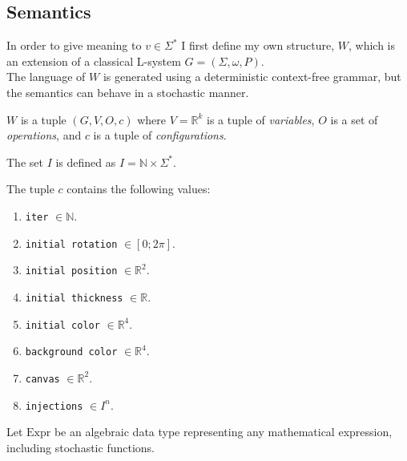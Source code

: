 \documentclass[a4paper]{article}
\begin{document}
\subsection{Semantics}

In order to give meaning to \(v \in \Sigma^*\)
I first define my own structure, \(W\), which is an extension of a classical
L-system \(G=(\Sigma, \omega, P)\). \\
The language of \(W\) is generated using a deterministic context-free grammar,
but the semantics can behave in a stochastic manner.

\(W\) is a tuple \((G, V, O, c)\)
where \(V = {\mathbb{R}^k}\) is a tuple of \textit{variables},
\(O\) is a set of \textit{operations},
and \(c\) is a tuple of \textit{configurations}.

The set \(I\) is defined as \(I=\mathbb{N} \times \Sigma^*\).

\pagebreak
The tuple \(c\) contains the following values:
\begin{enumerate}
    \item \texttt{iter} \(\in \mathbb{N}\).
    \item \texttt{initial rotation} \(\in [0; 2\pi]\).
    \item \texttt{initial position} \(\in {\mathbb{R}}^2\).
    \item \texttt{initial thickness} \(\in \mathbb{R}\).
    \item \texttt{initial color} \(\in {\mathbb{R}}^4\).
    \item \texttt{background color} \(\in {\mathbb{R}}^4\).
    \item \texttt{canvas} \(\in {\mathbb{R}}^2\).
    \item \texttt{injections} \(\in I^n\).
\end{enumerate}

Let \(\text{Expr}\) be an algebraic data type\cite{adt}
representing any mathematical expression, including stochastic functions.
\end{document}
